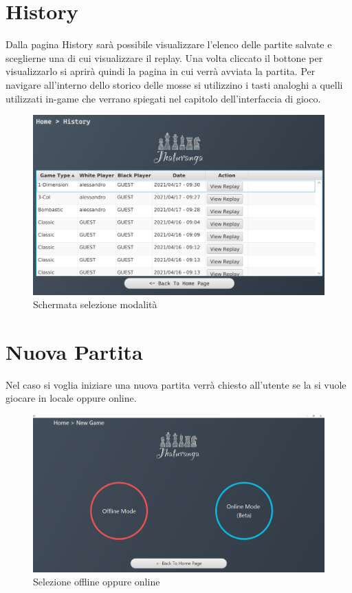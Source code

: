 \documentclass[a4paper,12pt]{report}
\begin{document}
\section{History}
Dalla pagina History sarà possibile visualizzare l'elenco delle partite salvate e sceglierne una di cui visualizzare il replay.
Una volta cliccato il bottone per visualizzarlo si aprirà quindi la pagina in cui verrà avviata la partita.
Per navigare all'interno dello storico delle mosse si utilizzino i tasti analoghi a quelli utilizzati in-game che verrano spiegati nel capitolo dell'interfaccia di gioco.
\begin{figure}[H]
    \begin{center}
        \centering
        \includegraphics[scale=0.4]{img/guidaUtente/guidaHistory.png}
    \end{center}
    \caption{Schermata selezione modalità}
    \label{img:guidaHistory}
\end{figure}

\section{Nuova Partita}
Nel caso si voglia iniziare una nuova partita verrà chiesto all'utente se la si vuole giocare in locale oppure online.

\begin{figure}[H]
    \begin{center}
        \centering
        \includegraphics[scale=0.25]{img/guidaUtente/onlineOffline.png}
    \end{center}
    \caption{Selezione offline oppure online}
    \label{img:onlineOffline}
\end{figure}
\end{document}
